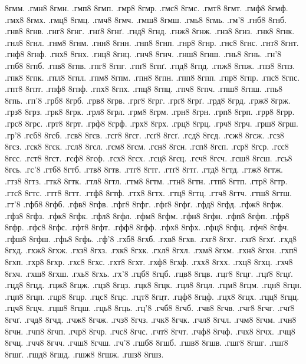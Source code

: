 {8гмм.
.гмн8
8гмн.
.гмп8
8гмп.
.гмр8
8гмр.
.гмс8
8гмс.
.гмт8
8гмт.
.гмф8
8гмф.
.гмх8
8гмх.
.гмц8
8гмц.
.гмч8
8гмч.
.гмш8
8гмш.
.гмь8
8гмь.
.гм'8
.гнб8
8гнб.
.гнв8
8гнв.
.гнг8
8гнг.
.гнґ8
8гнґ.
.гнд8
8гнд.
.гнж8
8гнж.
.гнз8
8гнз.
.гнк8
8гнк.
.гнл8
8гнл.
.гнм8
8гнм.
.гнн8
8гнн.
.гнп8
8гнп.
.гнр8
8гнр.
.гнс8
8гнс.
.гнт8
8гнт.
.гнф8
8гнф.
.гнх8
8гнх.
.гнц8
8гнц.
.гнч8
8гнч.
.гнш8
8гнш.
.гнь8
8гнь.
.гн'8
.гпб8
8гпб.
.гпв8
8гпв.
.гпг8
8гпг.
.гпґ8
8гпґ.
.гпд8
8гпд.
.гпж8
8гпж.
.гпз8
8гпз.
.гпк8
8гпк.
.гпл8
8гпл.
.гпм8
8гпм.
.гпн8
8гпн.
.гпп8
8гпп.
.гпр8
8гпр.
.гпс8
8гпс.
.гпт8
8гпт.
.гпф8
8гпф.
.гпх8
8гпх.
.гпц8
8гпц.
.гпч8
8гпч.
.гпш8
8гпш.
.гпь8
8гпь.
.гп'8
.грб8
8грб.
.грв8
8грв.
.грг8
8грг.
.грґ8
8грґ.
.грд8
8грд.
.грж8
8грж.
.грз8
8грз.
.грк8
8грк.
.грл8
8грл.
.грм8
8грм.
.грн8
8грн.
.грп8
8грп.
.грр8
8грр.
.грс8
8грс.
.грт8
8грт.
.грф8
8грф.
.грх8
8грх.
.грц8
8грц.
.грч8
8грч.
.грш8
8грш.
.гр'8
.гсб8
8гсб.
.гсв8
8гсв.
.гсг8
8гсг.
.гсґ8
8гсґ.
.гсд8
8гсд.
.гсж8
8гсж.
.гсз8
8гсз.
.гск8
8гск.
.гсл8
8гсл.
.гсм8
8гсм.
.гсн8
8гсн.
.гсп8
8гсп.
.гср8
8гср.
.гсс8
8гсс.
.гст8
8гст.
.гсф8
8гсф.
.гсх8
8гсх.
.гсц8
8гсц.
.гсч8
8гсч.
.гсш8
8гсш.
.гсь8
8гсь.
.гс'8
.гтб8
8гтб.
.гтв8
8гтв.
.гтг8
8гтг.
.гтґ8
8гтґ.
.гтд8
8гтд.
.гтж8
8гтж.
.гтз8
8гтз.
.гтк8
8гтк.
.гтл8
8гтл.
.гтм8
8гтм.
.гтн8
8гтн.
.гтп8
8гтп.
.гтр8
8гтр.
.гтс8
8гтс.
.гтт8
8гтт.
.гтф8
8гтф.
.гтх8
8гтх.
.гтц8
8гтц.
.гтч8
8гтч.
.гтш8
8гтш.
.гт'8
.гфб8
8гфб.
.гфв8
8гфв.
.гфг8
8гфг.
.гфґ8
8гфґ.
.гфд8
8гфд.
.гфж8
8гфж.
.гфз8
8гфз.
.гфк8
8гфк.
.гфл8
8гфл.
.гфм8
8гфм.
.гфн8
8гфн.
.гфп8
8гфп.
.гфр8
8гфр.
.гфс8
8гфс.
.гфт8
8гфт.
.гфф8
8гфф.
.гфх8
8гфх.
.гфц8
8гфц.
.гфч8
8гфч.
.гфш8
8гфш.
.гфь8
8гфь.
.гф'8
.гхб8
8гхб.
.гхв8
8гхв.
.гхг8
8гхг.
.гхґ8
8гхґ.
.гхд8
8гхд.
.гхж8
8гхж.
.гхз8
8гхз.
.гхк8
8гхк.
.гхл8
8гхл.
.гхм8
8гхм.
.гхн8
8гхн.
.гхп8
8гхп.
.гхр8
8гхр.
.гхс8
8гхс.
.гхт8
8гхт.
.гхф8
8гхф.
.гхх8
8гхх.
.гхц8
8гхц.
.гхч8
8гхч.
.гхш8
8гхш.
.гхь8
8гхь.
.гх'8
.гцб8
8гцб.
.гцв8
8гцв.
.гцг8
8гцг.
.гцґ8
8гцґ.
.гцд8
8гцд.
.гцж8
8гцж.
.гцз8
8гцз.
.гцк8
8гцк.
.гцл8
8гцл.
.гцм8
8гцм.
.гцн8
8гцн.
.гцп8
8гцп.
.гцр8
8гцр.
.гцс8
8гцс.
.гцт8
8гцт.
.гцф8
8гцф.
.гцх8
8гцх.
.гцц8
8гцц.
.гцч8
8гцч.
.гцш8
8гцш.
.гць8
8гць.
.гц'8
.гчб8
8гчб.
.гчв8
8гчв.
.гчг8
8гчг.
.гчґ8
8гчґ.
.гчд8
8гчд.
.гчж8
8гчж.
.гчз8
8гчз.
.гчк8
8гчк.
.гчл8
8гчл.
.гчм8
8гчм.
.гчн8
8гчн.
.гчп8
8гчп.
.гчр8
8гчр.
.гчс8
8гчс.
.гчт8
8гчт.
.гчф8
8гчф.
.гчх8
8гчх.
.гчц8
8гчц.
.гчч8
8гчч.
.гчш8
8гчш.
.гч'8
.гшб8
8гшб.
.гшв8
8гшв.
.гшг8
8гшг.
.гшґ8
8гшґ.
.гшд8
8гшд.
.гшж8
8гшж.
.гшз8
8гшз.
}
